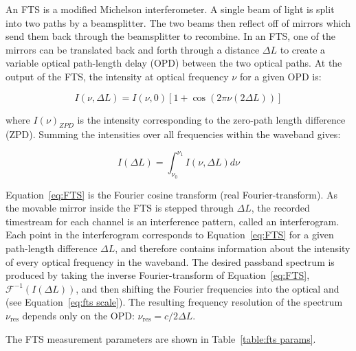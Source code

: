 An FTS is a modified Michelson interferometer. A single beam of light is split into two paths by a beamsplitter. The two beams then reflect off of mirrors which send them back through the beamsplitter to recombine. In an FTS, one of the mirrors can be translated back and forth through a distance $\Delta L$ to create a variable optical path-length delay (OPD) between the two optical paths. At the output of the FTS, the intensity at optical frequency $\nu$ for a given OPD is:

\begin{equation}
  I(\nu, \Delta L) = I(\nu, 0) \left[1 + \cos(2\pi \nu (2 \Delta L))\right]
\end{equation}

where $I(\nu)_{ZPD}$ is the intensity corresponding to the zero-path length difference (ZPD). Summing the intensities over all frequencies within the waveband gives:

\begin{equation}\label{eq:FTS}
  I(\Delta L) = \int_{\nu_{0}}^{\nu_{1}} I(\nu, \Delta L) d\nu
\end{equation}

Equation~\ref{eq:FTS} is the Fourier cosine transform (real Fourier-transform). As the movable mirror inside the FTS is stepped through $\Delta L$, the recorded timestream for each channel is an interference pattern, called an interferogram. Each point in the interferogram corresponds to Equation~\ref{eq:FTS} for a given path-length difference $\Delta L$, and therefore contains information about the intensity of every optical frequency in the waveband. The desired passband spectrum is produced by taking the inverse Fourier-transform of Equation~\ref{eq:FTS}, $\mathcal{F}^{-1}(I(\Delta L))$, and then shifting the Fourier frequencies into the optical and (see Equation~\ref{eq:fts scale}). The resulting frequency resolution of the spectrum $\nu_{\mathrm{res}}$ depends only on the OPD: $\nu_{\mathrm{res}} = c/2 \Delta L$.

The FTS measurement parameters are shown in Table~\ref{table:fts params}.

